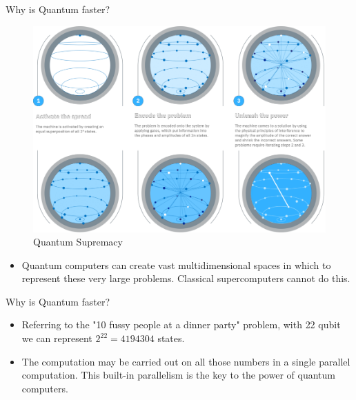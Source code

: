 \begin{frame}{Why is Quantum faster?}
\begin{figure}[H]
    \centering
    \includegraphics[width=.7\linewidth]{ quantumsup.png}
    \caption{Quantum Supremacy}
\end{figure}
\begin{itemize}
    \item Quantum computers can create vast multidimensional spaces in which to represent these very large problems. Classical supercomputers cannot do this.
   
\end{itemize}
  
\end{frame}

\begin{frame}{Why is Quantum faster?}
\begin{itemize}
 \item Referring to the "10 fussy people at a dinner party" problem, with \alert{22 qubit} we can represent $2^{22} = 4194304$ states.
    \item The computation may be carried out on all those numbers in a \alert{single parallel computation}. This built-in parallelism is the key to the power of quantum computers.
\end{itemize}
    
\end{frame}

